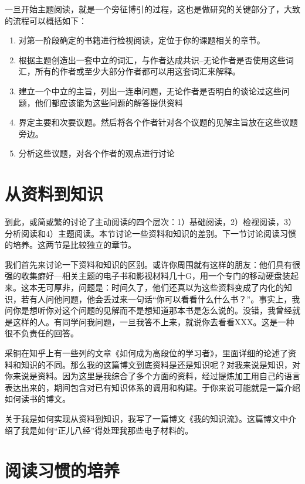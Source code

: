 \documentclass[10pt,a4paper,UTF8]{article}
\begin{document}
一旦开始主题阅读，就是一个旁征博引的过程，这也是做研究的关键部分了，大致的流程可以概括如下：

\begin{enumerate}
\item 对第一阶段确定的书籍进行检视阅读，定位于你的课题相关的章节。

\item 根据主题创造出一套中立的词汇，与作者达成共识--无论作者是否使用这些词汇，所有的作者或至少大部分作者都可以用这套词汇来解释。

\item 建立一个中立的主旨，列出一连串问题，无论作者是否明白的谈论过这些问题，他们都应该能为这些问题的解答提供资料

\item 界定主要和次要议题。然后将各个作者针对各个议题的见解主旨放在这些议题旁边。

\item 分析这些议题，对各个作者的观点进行讨论
\end{enumerate}


\section{从资料到知识}
\label{sec:orgheadline10}


到此，或简或繁的讨论了主动阅读的四个层次：1）基础阅读，2）检视阅读，3）分析阅读和4）主题阅读。本节讨论一些资料和知识的差别。下一节讨论阅读习惯的培养。这两节是比较独立的章节。

我们首先来讨论一下资料和知识的区别。或许你周围就有这样的朋友：他们具有很强的收集癖好---相关主题的电子书和影视材料几十G，用一个专门的移动硬盘装起来。这本无可厚非，问题是：时间久了，他们还真以为这些资料变成了内化的知识，若有人问他问题，他会丢过来一句话“你可以看看什么什么书？”。事实上，我问你是想听你对这个问题的见解而不是想知道那本书是怎么说的。没错，我曾经就是这样的人。有同学问我问题，一旦我答不上来，就说你去看看XXX。这是一种很不负责任的回答。

采铜在知乎上有一些列的文章《如何成为高段位的学习者》，里面详细的论述了资料和知识的不同。那么我的这篇博文到底资料是还是知识呢？对我来说是知识，对你来说是资料。因为这里是我综合了多个方面的资料，经过提炼加工用自己的语言表达出来的，期间包含对已有知识体系的调用和构建。于你来说可能就是一篇介绍如何读书的博文。

关于我是如何实现从资料到知识，我写了一篇博文《我的知识流》。这篇博文中介绍了我是如何“正儿八经”得处理我那些电子材料的。

\section{阅读习惯的培养}
\label{sec:orgheadline11}
\end{document}
